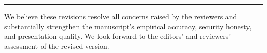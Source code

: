 \documentclass[12pt]{article}
\begin{document}
\vspace{2em}
\hrule
\vspace{1em}

\begin{center}
We believe these revisions resolve all concerns raised by the 
reviewers and substantially strengthen the manuscript's empirical accuracy,
security honesty, and presentation quality.  We look forward to the
editors' and reviewers' assessment of the revised version.
\end{center}
\end{document}
